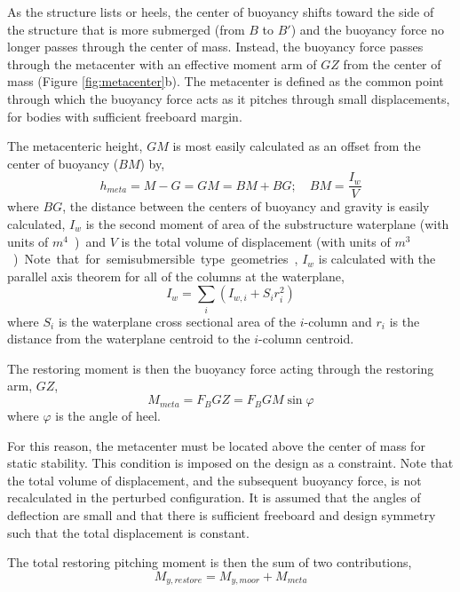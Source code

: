 As the structure lists or heels, the center of buoyancy shifts toward
the side of the structure that is more submerged (from $B$ to $B'$) and
the buoyancy force no longer passes through the center of mass.
Instead, the buoyancy force passes through the metacenter with an
effective moment arm of $GZ$ from the center of mass (Figure
\ref{fig:metacenter}b).  The metacenter is defined as the common point
through which the buoyancy force acts as it pitches through small
displacements, for bodies with sufficient freeboard margin.

The metacenteric height, $GM$ is most easily calculated as an offset from the
center of buoyancy ($BM$) by,
\begin{equation}
  h_{meta} = M - G = GM = BM + BG;\quad BM = \frac{I_w}{V}
\end{equation}
where $BG$, the distance between the centers of buoyancy and gravity is
easily calculated, $I_w$ is the second moment of area of the substructure waterplane
(with units of \unit{$m^4$}) and $V$ is the total volume of displacement
(with units of \unit{$m^3$}).  Note that for semisubmersible type
geometries, $I_w$ is calculated with the parallel axis theorem for all
of the columns at the waterplane,
\begin{equation}
  I_w = \sum_i \left( I_{w,i} + S_ir_i^2 \right)
\end{equation}
where $S_i$ is the waterplane cross sectional area of the $i$-\th column and $r_i$
is the distance from the waterplane centroid to the $i$-\th column centroid.

The restoring moment is then the buoyancy force acting through the
restoring arm, $GZ$,
\begin{equation}
  M_{meta} = F_B GZ = F_B GM \sin \varphi
\end{equation}
where $\varphi$ is the angle of heel.

For this reason, the metacenter must be located above the center of mass
for static stability.  This condition is imposed on the design as a
constraint.  Note that the total volume of displacement, and the
subsequent buoyancy force, is not recalculated in the perturbed
configuration.  It is assumed that the angles of deflection are small
and that there is sufficient freeboard and design symmetry such that the
total displacement is constant.

The total restoring pitching moment is then the sum of two
contributions,
\begin{equation}
  M_{y,restore} = M_{y,moor} + M_{meta}
\end{equation}

